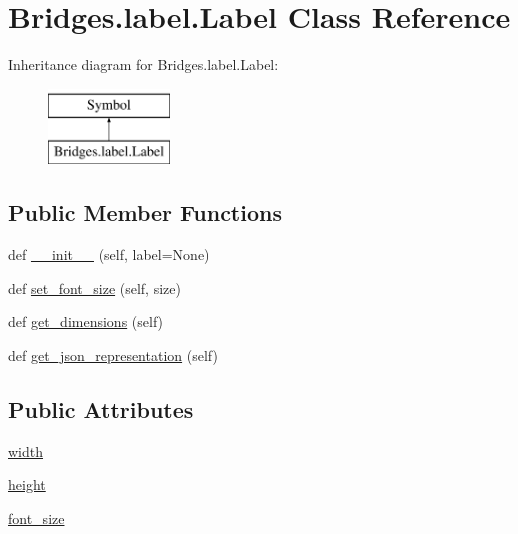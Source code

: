 \hypertarget{class_bridges_1_1label_1_1_label}{}\section{Bridges.\+label.\+Label Class Reference}
\label{class_bridges_1_1label_1_1_label}
Inheritance diagram for Bridges.\+label.\+Label\+:\begin{figure}[H]
\begin{center}
\leavevmode
\includegraphics[height=2.000000cm]{class_bridges_1_1label_1_1_label}
\end{center}
\end{figure}
\subsection*{Public Member Functions}
\begin{DoxyCompactItemize}
\item 
def \mbox{\hyperlink{class_bridges_1_1label_1_1_label_a205d9bf35a670f9c3fc91dab4fd4c107}{\+\_\+\+\_\+init\+\_\+\+\_\+}} (self, label=None)
\item 
def \mbox{\hyperlink{class_bridges_1_1label_1_1_label_aff0f1dc269d7c98c77664d3ed9664001}{set\+\_\+font\+\_\+size}} (self, size)
\item 
def \mbox{\hyperlink{class_bridges_1_1label_1_1_label_a05a2618dc5e2350214fcacd5f210dcbc}{get\+\_\+dimensions}} (self)
\item 
def \mbox{\hyperlink{class_bridges_1_1label_1_1_label_a84b96a49d92ddc7ea0b387c37a6fadaf}{get\+\_\+json\+\_\+representation}} (self)
\end{DoxyCompactItemize}
\subsection*{Public Attributes}
\begin{DoxyCompactItemize}
\item 
\mbox{\hyperlink{class_bridges_1_1label_1_1_label_a47c8f760dbd7b2a2e5dc3b94bc9d9ce2}{width}}
\item 
\mbox{\hyperlink{class_bridges_1_1label_1_1_label_a99fa1d9cff754c373fac09b24427df49}{height}}
\item 
\mbox{\hyperlink{class_bridges_1_1label_1_1_label_a1e2e6070c858b66a3f97e7aa91a4ea66}{font\+\_\+size}}
\end{DoxyCompactItemize}


